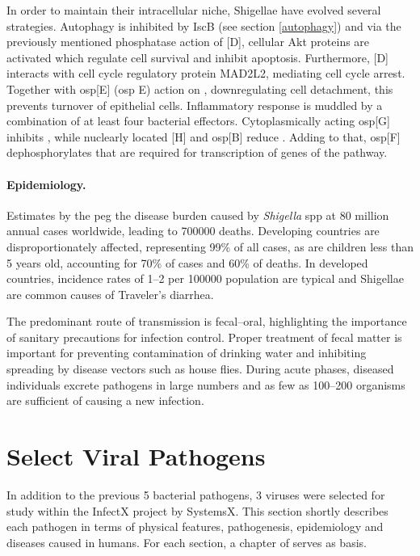 In order to maintain their intracellular niche, Shigellae have evolved several strategies. Autophagy is inhibited by IscB (see section \ref{autophagy}) and via the previously mentioned phosphatase action of [D], cellular Akt proteins are activated which regulate cell survival and inhibit apoptosis. Furthermore, [D] interacts with cell cycle regulatory protein MAD2L2, mediating cell cycle arrest. Together with \acrshort{osp}[E] (\acrlong{osp} E) action on , downregulating cell detachment, this prevents turnover of epithelial cells. Inflammatory response is muddled by a combination of at least four bacterial effectors. Cytoplasmically acting \acrshort{osp}[G] inhibits , while nuclearly located [H] and \acrshort{osp}[B] reduce . Adding to that, \acrshort{osp}[F] dephosphorylates  that are required for transcription of genes of the  pathway.

\paragraph{Epidemiology.}
Estimates by the  peg the disease burden caused by \textit{Shigella} \acrshort{spp} at 80 million annual cases worldwide, leading to 700000 deaths. Developing countries are disproportionately affected, representing 99\% of all cases, as are children less than 5 years old, accounting for 70\% of cases and 60\% of deaths. In developed countries, incidence rates of 1--2 per 100000 population are typical and Shigellae are common causes of Traveler's diarrhea.

The predominant route of transmission is fecal--oral, highlighting the importance of sanitary precautions for infection control. Proper treatment of fecal matter is important for preventing contamination of drinking water and inhibiting spreading by disease vectors such as house flies. During acute phases, diseased individuals excrete pathogens in large numbers and as few as 100--200 organisms are sufficient of causing a new infection.

\section{Select Viral Pathogens}

In addition to the previous 5 bacterial pathogens, 3 viruses were selected for study within the InfectX  project by SystemsX. This section shortly describes each pathogen in terms of physical features, pathogenesis, epidemiology and diseases caused in humans. For each section, a chapter of \citet{Craighead2000} serves as basis.

